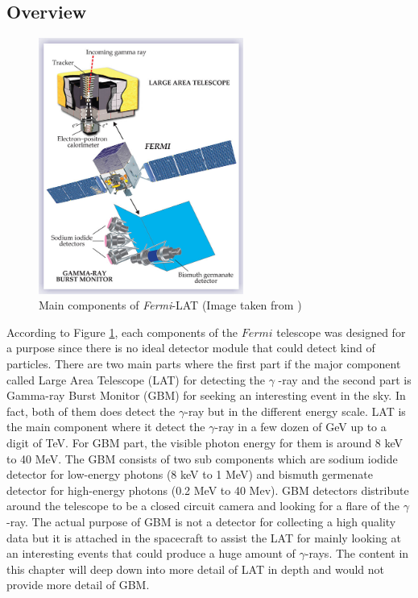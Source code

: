 \subsection{Overview}

\begin{figure}[h!]
    \centering
    \includegraphics[width=0.6\textwidth]{content/background/figures/fermi_instrument.jpeg}
    \caption{Main components of \textit{Fermi}-LAT (Image taken from \cite{fermi_lat_instrument_first_year})}
    \label{fig:fermi_main_components}
\end{figure}
According to Figure \ref{fig:fermi_main_components},
each components of the $Fermi$ telescope was designed for a purpose since there 
is no ideal detector module that could detect kind of particles.
There are two main parts where the first part if the major component 
called Large Area Telescope (LAT) for detecting the $\gamma$
-ray and the second part is Gamma-ray Burst Monitor (GBM) for seeking 
an interesting event in the sky. In fact, both of them does detect 
the $\gamma$-ray but in the different energy scale. LAT is the main 
component where it detect the $\gamma$-ray in a few dozen of GeV 
up to a digit of TeV. For GBM part, the visible photon energy 
for them is around 8 keV to 40 MeV. The GBM consists of two 
sub components which are sodium iodide detector for low-energy photons
(8 keV to 1 MeV) and bismuth germenate detector for high-energy photons 
(0.2 MeV to 40 Mev). GBM detectors distribute around 
the telescope to be a closed circuit camera and looking for a flare 
of the $\gamma$-ray. The actual purpose of GBM is not a detector 
for collecting a high quality data but it is attached in the spacecraft 
to assist the LAT for mainly looking at an interesting events that could 
produce a huge amount of $\gamma$-rays. The content in this chapter 
will deep down into more detail of LAT in depth and would not provide 
more detail of GBM.

